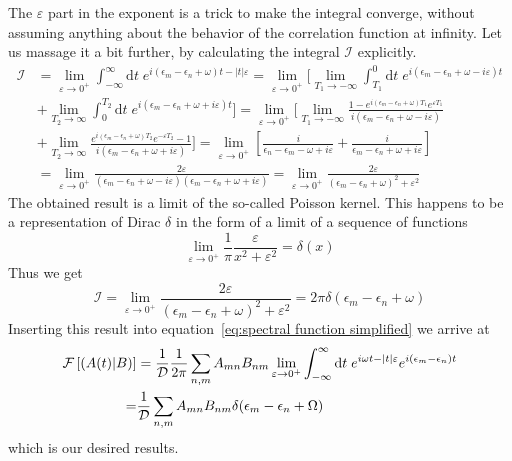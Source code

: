 The \(\varepsilon \) part in the exponent is a trick to make the integral converge, without assuming anything
about the behavior of the correlation function at infinity.
Let us massage it a bit further, by calculating the integral \(\mathcal{I}\) explicitly.
\begin{align}
    \mathcal{I} & = \lim _{\varepsilon \to 0^+} \int_{-\infty}^{\infty} \mathrm{d} t \;
    e^{ i (\epsilon_m-\epsilon_n+\omega)t -|t| \varepsilon} = \lim _{\varepsilon \to 0^+}
    \Bigg[\lim_{T_1\to -\infty}\int_{T_1}^{0} \mathrm{d} t \; e^{ i (\epsilon_m-\epsilon_n+\omega -i \varepsilon)t}\nonumber         \\
                & +\lim_{T_2\to \infty}\int_{0}^{T_2} \mathrm{d} t \;  e^{ i (\epsilon_m-\epsilon_n+\omega + i\varepsilon)t}\Bigg]
    = \lim _{\varepsilon \to 0^+} \Bigg[\lim_{T_1\to -\infty}
    \frac{1-e^{ i (\epsilon_m-\epsilon_n+\omega )T_1} e^{\varepsilon T_1}}{i (\epsilon_m-\epsilon_n+\omega -i \varepsilon)}\nonumber \\
                & + \lim_{T_2\to \infty} \frac{e^{ i (\epsilon_m-\epsilon_n+\omega )T_2} e^{-\varepsilon T_2}-1}
    {i (\epsilon_m-\epsilon_n+\omega +i \varepsilon)}\Bigg]
    = \lim _{\varepsilon \to 0^+} \left[\frac{i}{\epsilon_n-\epsilon_m-\omega +i \varepsilon} +
    \frac{i}{\epsilon_m-\epsilon_n+\omega +i \varepsilon} \right]\nonumber                                                           \\
                & = \lim _{\varepsilon \to 0^+}
    \frac{2\varepsilon}{(\epsilon_m-\epsilon_n+\omega -i \varepsilon)(\epsilon_m-\epsilon_n+\omega +i \varepsilon)}
    =\lim _{\varepsilon \to 0^+} \frac{2\varepsilon}{(\epsilon_m-\epsilon_n+\omega)^2 +\varepsilon^2}
\end{align}
The obtained result is a limit of the so-called Poisson kernel. This happens to be
a representation of Dirac \(\delta\) in the form of a limit of a sequence of functions~\autocite{Byron1992}
\begin{equation}
    \lim _{\varepsilon \to 0^+} \frac{1}{\pi} \frac{\varepsilon}{x^2 +\varepsilon^2} = \delta(x)
\end{equation}
Thus we get
\begin{equation}
    \mathcal{I} = \lim _{\varepsilon \to 0^+} \frac{2\varepsilon}{(\epsilon_m-\epsilon_n+\omega)^2 +\varepsilon^2}
    = 2\pi \delta(\epsilon_m-\epsilon_n+\omega)
\end{equation}
Inserting this result into equation~\eqref{eq:spectral function simplified} we arrive at
\begin{align}
    \mathcal{F}\left[\left(A(t) \middle| B\right)\right] & = \frac{1}{\mathcal{D}} \frac{1}{2 \pi}\sum_{n,m} A_{mn} B_{nm}
    \lim _{\varepsilon \to 0^+} \int_{-\infty}^{\infty} \mathrm{d} t \; e^{i \omega t-|t|
    \varepsilon}e^{i (\epsilon_m-\epsilon_n) t} \nonumber                                                                    \\
    =                                    & \frac{1}{\mathcal{D}}\sum_{n,m} A_{mn} B_{nm} \delta(\epsilon_m-\epsilon_n+\Omega)
\end{align}
which is our desired results.

